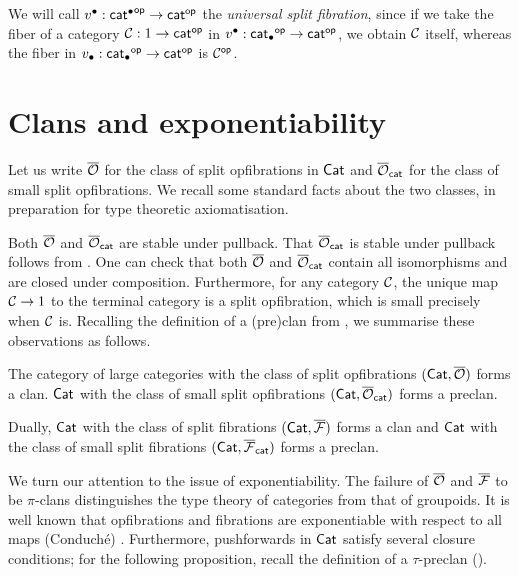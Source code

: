 We will call ${v^\bullet} : {\mathsf{cat}^\bullet}^{\mathsf{op}} \to {\mathsf{cat}}^{\mathsf{op}}$
the \emph{universal split fibration},
since if we take the fiber of a category $\mathcal{C} : 1 \to {\mathsf{cat}}^{\mathsf{op}}$
in ${v^\bullet} : {\mathsf{cat}_\bullet}^{\mathsf{op}} \to {\mathsf{cat}}^{\mathsf{op}}$,
we obtain $\mathcal{C}$ itself,
whereas the fiber in ${v_\bullet} : {\mathsf{cat}_\bullet}^{\mathsf{op}} \to {\mathsf{cat}}^{\mathsf{op}}$ is $\mathcal{C}^{\mathsf{op}}$.

\section*{Clans and exponentiability}

Let us write ${\overline{{\mathcal{O}}}}$ for the class of split opfibrations
in $\mathsf{Cat}$ and ${\overline{{\mathcal{O}}}}_{\mathsf{cat}}$ for the class of small split opfibrations.
We recall some standard facts about the two classes,
in preparation for type theoretic axiomatisation.

Both ${\overline{{\mathcal{O}}}}$ and ${\overline{{\mathcal{O}}}}_{\mathsf{cat}}$ are stable under pullback.
That ${\overline{{\mathcal{O}}}}_{\mathsf{cat}}$ is stable under pullback follows from
.
One can check that both
${\overline{{\mathcal{O}}}}$ and ${\overline{{\mathcal{O}}}}_{\mathsf{cat}}$ contain all isomorphisms
and are closed under composition.
Furthermore, for any category $\mathcal{C}$,
the unique map $\mathcal{C} \to 1$ to the terminal category
is a split opfibration,
which is small precisely when $\mathcal{C}$ is.
Recalling the definition of a (pre)clan from ,
we summarise these observations as follows.

\begin{proposition}\label{prop:preclans-in-cat}
  The category of large categories with the class of split opfibrations
  $(\mathsf{Cat}, {\overline{{\mathcal{O}}}})$ forms a clan.
  $\mathsf{Cat}$ with the class of small split opfibrations
  $(\mathsf{Cat}, {\overline{{\mathcal{O}}}}_{\mathsf{cat}})$ forms a preclan.
  
  Dually,
  $\mathsf{Cat}$ with the class of split fibrations
  $(\mathsf{Cat}, {\overline{{\mathcal{F}}}})$ forms a clan
  and $\mathsf{Cat}$ with the class of small split fibrations
  $(\mathsf{Cat}, {\overline{{\mathcal{F}}}}_{\mathsf{cat}})$ forms a preclan.
\end{proposition}

We turn our attention to the issue of exponentiability.
The failure of ${\overline{{\mathcal{O}}}}$ and ${\overline{{\mathcal{F}}}}$ to be $\pi$-clans
distinguishes the type theory of categories from that of groupoids.
It is well known that opfibrations and fibrations are
exponentiable with respect to all maps (Conduch\'e)
\cite{giraud1964, conduche1972}.
Furthermore, pushforwards in $\mathsf{Cat}$ satisfy several closure conditions;
for the following proposition,
recall the definition of a $\tau$-preclan ().

